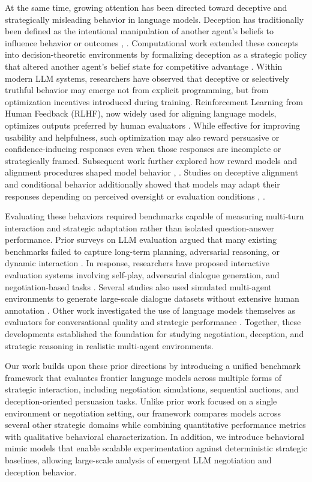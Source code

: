 \documentclass[conference]{IEEEtran}
\begin{document}
At the same time, growing attention has been directed toward deceptive and strategically misleading behavior in language models. Deception has traditionally been defined as the intentional manipulation of another agent’s beliefs to influence behavior or outcomes \cite{Chisholm}, \cite{Faulkner}. Computational work extended these concepts into decision-theoretic environments by formalizing deception as a strategic policy that altered another agent’s belief state for competitive advantage \cite{Abdulhai}. Within modern LLM systems, researchers have observed that deceptive or selectively truthful behavior may emerge not from explicit programming, but from optimization incentives introduced during training. Reinforcement Learning from Human Feedback (RLHF), now widely used for aligning language models, optimizes outputs preferred by human evaluators \cite{Ouyang}. While effective for improving usability and helpfulness, such optimization may also reward persuasive or confidence-inducing responses even when those responses are incomplete or strategically framed. Subsequent work further explored how reward models and alignment procedures shaped model behavior \cite{Bai1}, \cite{Bai2}. Studies on deceptive alignment and conditional behavior additionally showed that models may adapt their responses depending on perceived oversight or evaluation conditions \cite{Greenblatt}, \cite{E. Hubinger}.

Evaluating these behaviors required benchmarks capable of measuring multi-turn interaction and strategic adaptation rather than isolated question-answer performance. Prior surveys on LLM evaluation argued that many existing benchmarks failed to capture long-term planning, adversarial reasoning, or dynamic interaction \cite{Chang}. In response, researchers have proposed interactive evaluation systems involving self-play, adversarial dialogue generation, and negotiation-based tasks \cite{Perez}. Several studies also used simulated multi-agent environments to generate large-scale dialogue datasets without extensive human annotation \cite{Abdullin}. Other work investigated the use of language models themselves as evaluators for conversational quality and strategic performance \cite{Zheng}. Together, these developments established the foundation for studying negotiation, deception, and strategic reasoning in realistic multi-agent environments.

Our work builds upon these prior directions by introducing a unified benchmark framework that evaluates frontier language models across multiple forms of strategic interaction, including negotiation simulations, sequential auctions, and deception-oriented persuasion tasks. Unlike prior work focused on a single environment or negotiation setting, our framework compares models across several other strategic domains while combining quantitative performance metrics with qualitative behavioral characterization. In addition, we introduce behavioral mimic models that enable scalable experimentation against deterministic strategic baselines, allowing large-scale analysis of emergent LLM negotiation and deception behavior.
\end{document}
